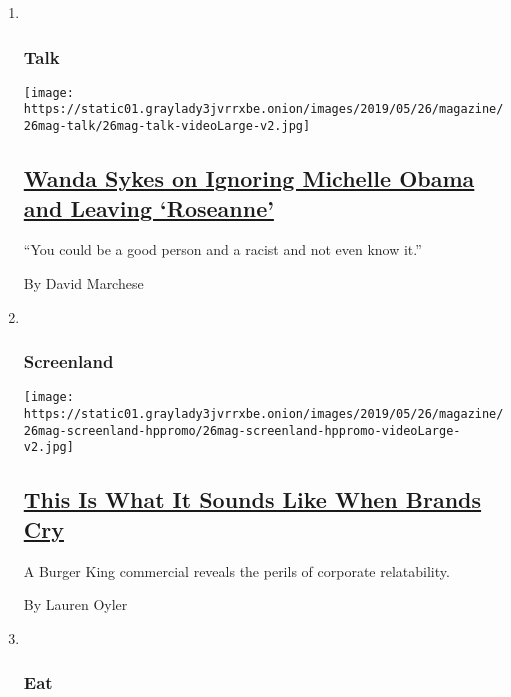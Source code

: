 \begin{enumerate}
\def\labelenumi{\arabic{enumi}.}
\item ~
  \hypertarget{talk}{%
  \subsubsection{Talk}\label{talk}}

  \texttt{[image: https://static01.graylady3jvrrxbe.onion/images/2019/05/26/magazine/26mag-talk/26mag-talk-videoLarge-v2.jpg]}

  \hypertarget{wanda-sykes-on-ignoring-michelle-obama-and-leaving-roseanne}{%
  \subsection{\texorpdfstring{\href{/interactive/2019/05/20/magazine/wanda-sykes-comedy-rosanne.html}{Wanda
  Sykes on Ignoring Michelle Obama and Leaving
  `Roseanne'}}{Wanda Sykes on Ignoring Michelle Obama and Leaving `Roseanne'}}\label{wanda-sykes-on-ignoring-michelle-obama-and-leaving-roseanne}}

  ``You could be a good person and a racist and not even know it.''

  By David Marchese
\item ~
  \hypertarget{screenland}{%
  \subsubsection{Screenland}\label{screenland}}

  \texttt{[image: https://static01.graylady3jvrrxbe.onion/images/2019/05/26/magazine/26mag-screenland-hppromo/26mag-screenland-hppromo-videoLarge-v2.jpg]}

  \hypertarget{this-is-what-it-sounds-like-when-brands-cry}{%
  \subsection{\texorpdfstring{\href{/2019/05/22/magazine/burger-king-real-meals-ad.html}{This
  Is What It Sounds Like When Brands
  Cry}}{This Is What It Sounds Like When Brands Cry}}\label{this-is-what-it-sounds-like-when-brands-cry}}

  A Burger King commercial reveals the perils of corporate relatability.

  By Lauren Oyler
\item ~
  \hypertarget{eat}{%
  \subsubsection{Eat}\label{eat}}


\end{enumerate}
